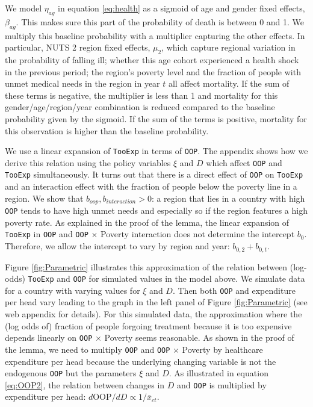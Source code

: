 \documentclass[a4paper,12pt]{article}
\begin{document}
We model \({\eta}_{ag}\) in equation \eqref{eq:health} as a sigmoid of age and gender fixed effects, \(\beta_{ag}\). This makes sure this part of the probability of death is between 0 and 1. We multiply this baseline probability with a multiplier capturing the other effects. In particular, NUTS 2 region fixed effects, \(\mu_2\), which capture regional variation in the probability of falling ill; whether this age cohort experienced a health shock in the previous period; the region's poverty level and the fraction of people with unmet medical needs in the region in year \(t\) all affect mortality. If the sum of these terms is negative, the multiplier is less than 1 and mortality for this gender/age/region/year combination is reduced compared to the baseline probability given by the sigmoid. If the sum of the terms is positive, mortality for this observation is higher than the baseline probability.

We use a linear expansion of \texttt{TooExp} in terms of \texttt{OOP}. The appendix shows how we derive this relation using the policy variables \(\xi\) and \(D\) which affect \texttt{OOP} and \texttt{TooExp} simultaneously. It turns out that there is a direct effect of \texttt{OOP} on \texttt{TooExp} and an interaction effect with the fraction of people below the poverty line in a region. We show that \(b_{oop},b_{interaction} > 0\): a region that lies in a country with high \texttt{OOP} tends to have high unmet needs and especially so if the region features a high poverty rate. As explained in the proof of the lemma, the linear expansion of \texttt{TooExp} in \texttt{OOP} and \texttt{OOP} \(\times\) Poverty interaction does not determine the intercept \(b_{0}\). Therefore, we allow the intercept to vary by region and year: \(b_{0,2} + b_{0,t}\). 

Figure \ref{fig:Parametric} illustrates this approximation of the relation between (log-odds) \texttt{TooExp} and \texttt{OOP} for simulated values in the model above. We simulate data for a country with varying values for \(\xi\) and \(D\). Then both \texttt{OOP} and expenditure per head vary leading to the graph in the left panel of Figure \ref{fig:Parametric} (see web appendix for details). For this simulated data, the approximation where the (log odds of) fraction of people forgoing treatment because it is too expensive depends linearly on \texttt{OOP} \(\times\) Poverty seems reasonable. As shown in the proof of the lemma, we need to multiply \texttt{OOP} and \texttt{OOP} \(\times\) Poverty by healthcare expenditure per head because the underlying changing variable is not the endogenous \texttt{OOP} but the parameters \(\xi\) and \(D\). As illustrated in equation \eqref{eq:OOP2}, the relation between changes in \(D\) and \texttt{OOP} is multiplied by expenditure per head: \(d \text{OOP}/d D \propto 1/\bar{x}_{ct}\).
\end{document}
